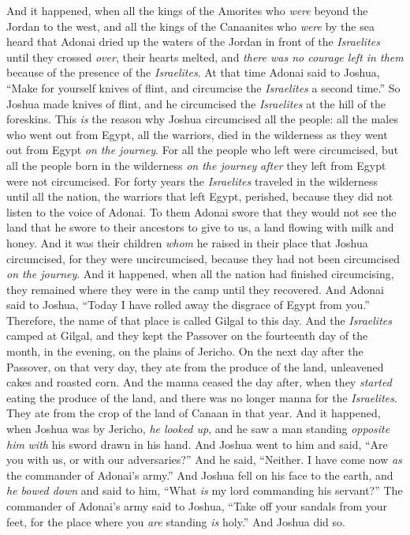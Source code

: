 \begin{biblechapter} %
 And it happened, when all the kings of the Amorites who \textit{were} beyond the Jordan to the west, and all the kings of the Canaanites who \textit{were} by the sea heard that Adonai dried up the waters of the Jordan in front of the \textit{Israelites} until they crossed \textit{over}, their hearts melted, and \textit{there was no courage left in them} because of the presence of the \textit{Israelites}. 
\verse At that time Adonai said to Joshua, “Make for yourself knives of flint, and circumcise the \textit{Israelites} a second time.”
\verse So Joshua made knives of flint, and he circumcised the \textit{Israelites} at the hill of the foreskins.
\verse This \textit{is} the reason why Joshua circumcised all the people: all the males who went out from Egypt, all the warriors, died in the wilderness as they went out from Egypt \textit{on the journey}.
\verse For all the people who left were circumcised, but all the people born in the wilderness \textit{on the journey} \textit{after} they left from Egypt were not circumcised.
\verse For forty years the \textit{Israelites} traveled in the wilderness until all the nation, the warriors that left Egypt, perished, because they did not listen to the voice of Adonai. To them Adonai swore that they would not see the land that he swore to their ancestors to give to us, a land flowing with milk and honey.
\verse And it was their children \textit{whom} he raised in their place that Joshua circumcised, for they were uncircumcised, because they had not been circumcised \textit{on the journey}.
 And it happened, when all the nation had finished circumcising, they remained where they were in the camp until they recovered.
\verse And Adonai said to Joshua, “Today I have rolled away the disgrace of Egypt from you.” Therefore, the name of that place is called Gilgal to this day.
\verse And the \textit{Israelites} camped at Gilgal, and they kept the Passover on the fourteenth day of the month, in the evening, on the plains of Jericho.
\verse On the next day after the Passover, on that very day, they ate from the produce of the land, unleavened cakes and roasted corn.
\verse And the manna ceased the day after, when they \textit{started} eating the produce of the land, and there was no longer manna for the \textit{Israelites}. They ate from the crop of the land of Canaan in that year.
 And it happened, when Joshua was by Jericho, \textit{he looked up}, and he saw a man standing \textit{opposite him} \textit{with} his sword drawn in his hand. And Joshua went to him and said, “Are you with us, or with our adversaries?”
\verse And he said, “Neither. I have come now \textit{as} the commander of Adonai’s army.” And Joshua fell on his face to the earth, and \textit{he bowed down} and said to him, “What \textit{is} my lord commanding his servant?”
\verse The commander of Adonai’s army said to Joshua, “Take off your sandals from your feet, for the place where you \textit{are} standing \textit{is} holy.” And Joshua did so.
\end{biblechapter}

